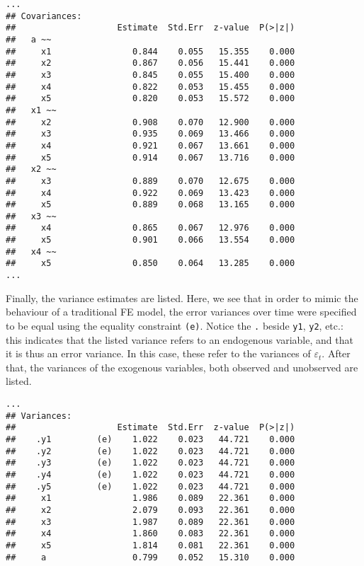\documentclass[
  12pt,
  a4paper]{article}
\begin{document}
\begin{verbatim}
...
## Covariances:
##                    Estimate  Std.Err  z-value  P(>|z|)
##   a ~~                                                
##     x1                0.844    0.055   15.355    0.000
##     x2                0.867    0.056   15.441    0.000
##     x3                0.845    0.055   15.400    0.000
##     x4                0.822    0.053   15.455    0.000
##     x5                0.820    0.053   15.572    0.000
##   x1 ~~                                               
##     x2                0.908    0.070   12.900    0.000
##     x3                0.935    0.069   13.466    0.000
##     x4                0.921    0.067   13.661    0.000
##     x5                0.914    0.067   13.716    0.000
##   x2 ~~                                               
##     x3                0.889    0.070   12.675    0.000
##     x4                0.922    0.069   13.423    0.000
##     x5                0.889    0.068   13.165    0.000
##   x3 ~~                                               
##     x4                0.865    0.067   12.976    0.000
##     x5                0.901    0.066   13.554    0.000
##   x4 ~~                                               
##     x5                0.850    0.064   13.285    0.000
...
\end{verbatim}

\doublespacing

Finally, the variance estimates are listed. Here, we see that in order
to mimic the behaviour of a traditional FE model, the error variances
over time were specified to be equal using the equality constraint
\texttt{(e)}. Notice the \texttt{.} beside \texttt{y1}, \texttt{y2},
etc.: this indicates that the listed variance refers to an endogenous
variable, and that it is thus an error variance. In this case, these
refer to the variances of \(\varepsilon_{t}\). After that, the variances
of the exogenous variables, both observed and unobserved are listed.

\singlespacing

\begin{verbatim}
...
## Variances:
##                    Estimate  Std.Err  z-value  P(>|z|)
##    .y1         (e)    1.022    0.023   44.721    0.000
##    .y2         (e)    1.022    0.023   44.721    0.000
##    .y3         (e)    1.022    0.023   44.721    0.000
##    .y4         (e)    1.022    0.023   44.721    0.000
##    .y5         (e)    1.022    0.023   44.721    0.000
##     x1                1.986    0.089   22.361    0.000
##     x2                2.079    0.093   22.361    0.000
##     x3                1.987    0.089   22.361    0.000
##     x4                1.860    0.083   22.361    0.000
##     x5                1.814    0.081   22.361    0.000
##     a                 0.799    0.052   15.310    0.000
\end{verbatim}
\end{document}
